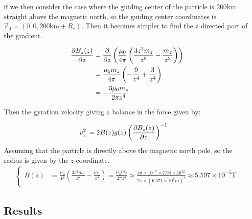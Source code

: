 \documentclass[x11names]{article}
\renewcommand{\va}{\vec}
\begin{document}
  \noindent if we then consider the case where the guiding center of the particle is \(200 \si{\kilo\meter}\) straight above the magnetic north, so the guiding center coordinates is
  \( \va{r}_0 = (0,0,200\si{\kilo\meter} + R_e)\). Then it becomes simpler to find the z directed part of the gradient.

  \begin{align}
    \pdv{B_z(z)}{z} &= \pdv{}{z}\left( \frac{\mu_0}{4\pi} \left(\frac{3z^2m_z}{z^5} - \frac{m_z}{z^3} \right)\right)
    \\
    &= \frac{\mu_0m_z}{4\pi} \left( - \frac{9}{z^4} + \frac{3}{z^4} \right)
    \\
    &= - \frac{3\mu_0m_z}{2\pi z^4}
  \end{align}

  Then the gyration velocity giving a balance in the force given by:

  \begin{align}
    v^2_\perp &=  2B(z)g(z) \left(\pdv{B_z(z)}{z} \right)^{-1}
  \end{align}
  Assuming that the particle is directly above the magnetic north pole, so the radius is given by the \(z\)-coordinate.
  \begin{align}
    \begin{cases}
      B(z) &= \frac{\mu_0}{4\pi}\left( \frac{3z^2m_z}{z^5} - \frac{m_z}{z^3} \right) =  \frac{\mu_0 m_z}{2\pi z^3} \approx \frac{4\pi \times 10^{-7} \times 7.94 \times 10^{22}}{2\pi\times (6.571\times 10^6 \si{m})^3} \approx 5.597\times 10 ^{-5} \si{\tesla}
    \end{cases}
  \end{align}


\subsection{Results}
\end{document}
